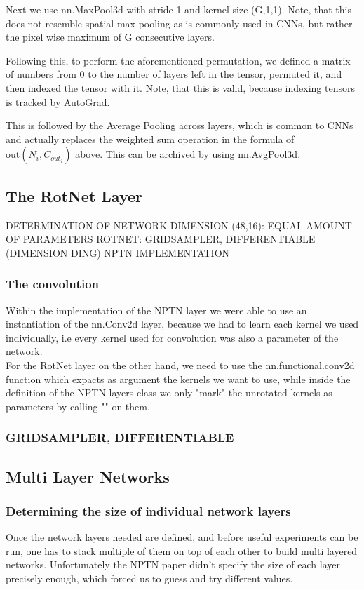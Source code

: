 \documentclass{llncs}
\begin{document}
Next we use nn.MaxPool3d with stride 1 and kernel size (G,1,1). Note, that this does not resemble spatial max pooling as is commonly used in CNNs, but rather the pixel wise maximum of G consecutive layers.

Following this, to perform the aforementioned permutation, we defined a matrix of numbers from 0 to the number of layers left in the tensor, permuted it, and then indexed the tensor with it. Note, that this is valid, because indexing tensors is tracked by AutoGrad.

This is followed by the Average Pooling across layers, which is common to CNNs and actually replaces the weighted sum operation in the formula of $\text{out}(N_i, C_{out_j})$ above. This can be archived by using nn.AvgPool3d.

\subsection{The RotNet Layer}
DETERMINATION OF NETWORK DIMENSION (48,16): EQUAL AMOUNT
OF PARAMETERS
ROTNET: GRIDSAMPLER, DIFFERENTIABLE
(DIMENSION DING)
NPTN IMPLEMENTATION

\subsubsection{The convolution}
Within the implementation of the NPTN layer we were able to use an instantiation of the nn.Conv2d layer, because we had to learn each kernel we used individually, i.e every kernel used for convolution was also a parameter of the network.\\
For the RotNet layer on the other hand, we need to use the nn.functional.conv2d function which expacts as argument the kernels we want to use, while inside the definition of the NPTN layers class we only "mark" the unrotated kernels as parameters by calling "" on them.

\subsubsection{GRIDSAMPLER, DIFFERENTIABLE}

\subsection{Multi Layer Networks}
\subsubsection{Determining the size of individual network layers}
Once the network layers needed are defined, and before useful experiments can be run, one has to stack multiple of them on top of each other to build multi layered networks.
Unfortunately the NPTN paper didn't specify the size of each layer precisely enough, which forced us to guess and try different values.
\end{document}
